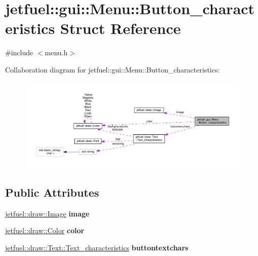 \hypertarget{structjetfuel_1_1gui_1_1Menu_1_1Button__characteristics}{}\section{jetfuel\+:\+:gui\+:\+:Menu\+:\+:Button\+\_\+characteristics Struct Reference}
\label{structjetfuel_1_1gui_1_1Menu_1_1Button__characteristics}


{\ttfamily \#include $<$menu.\+h$>$}



Collaboration diagram for jetfuel\+:\+:gui\+:\+:Menu\+:\+:Button\+\_\+characteristics\+:\nopagebreak
\begin{figure}[H]
\begin{center}
\leavevmode
\includegraphics[width=350pt]{structjetfuel_1_1gui_1_1Menu_1_1Button__characteristics__coll__graph}
\end{center}
\end{figure}
\subsection*{Public Attributes}
\begin{DoxyCompactItemize}
\item 
\mbox{\label{structjetfuel_1_1gui_1_1Menu_1_1Button__characteristics_ac808e56f02360af082de0acedaa95328}} 
\hyperlink{classjetfuel_1_1draw_1_1Image}{jetfuel\+::draw\+::\+Image} {\bfseries image}
\item 
\mbox{\label{structjetfuel_1_1gui_1_1Menu_1_1Button__characteristics_a51bce0c5c61b39fb45b6f2267ab9fc17}} 
\hyperlink{classjetfuel_1_1draw_1_1Color}{jetfuel\+::draw\+::\+Color} {\bfseries color}
\item 
\mbox{\label{structjetfuel_1_1gui_1_1Menu_1_1Button__characteristics_a19d5d256fb348fd17efe64d23f9d7023}} 
\hyperlink{structjetfuel_1_1draw_1_1Text_1_1Text__characteristics}{jetfuel\+::draw\+::\+Text\+::\+Text\+\_\+characteristics} {\bfseries buttontextchars}
\end{DoxyCompactItemize}


